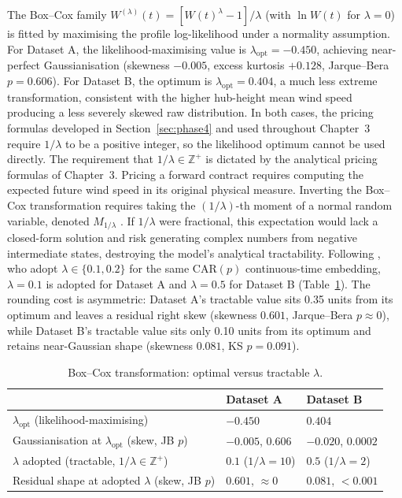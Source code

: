 \documentclass[11pt, a4paper, twoside]{article}
\begin{document}
The Box--Cox family $W^{(\lambda)}(t) = [W(t)^\lambda - 1]/\lambda$ (with $\ln W(t)$ for $\lambda = 0$) is fitted by maximising the profile log-likelihood under a normality assumption. For Dataset A, the likelihood-maximising value is $\lambda_{\text{opt}} = -0.450$, achieving near-perfect Gaussianisation (skewness $-0.005$, excess kurtosis $+0.128$, Jarque--Bera $p = 0.606$). For Dataset B, the optimum is $\lambda_{\text{opt}} = 0.404$, a much less extreme transformation, consistent with the higher hub-height mean wind speed producing a less severely skewed raw distribution. In both cases, the pricing formulas developed in Section~\ref{sec:phase4} and used throughout Chapter~3 require $1/\lambda$ to be a positive integer, so the likelihood optimum cannot be used directly. The requirement that $1/\lambda \in \mathbb{Z}^+$ is dictated by the analytical pricing formulas of Chapter~3. Pricing a forward contract requires computing the expected future wind speed in its original physical measure. Inverting the Box--Cox transformation requires taking the $(1/\lambda)$-th moment of a normal random variable, denoted $M_{1/\lambda}$ \citep{BenthSaltyteBenth2009}. If $1/\lambda$ were fractional, this expectation would lack a closed-form solution and risk generating complex numbers from negative intermediate states, destroying the model's analytical tractability. Following \citet{BenthSaltyteBenth2009}, who adopt $\lambda \in \{0.1, 0.2\}$ for the same CAR$(p)$ continuous-time embedding, $\lambda = 0.1$ is adopted for Dataset A and $\lambda = 0.5$ for Dataset B (Table~\ref{tab:boxcox}). The rounding cost is asymmetric: Dataset A's tractable value sits 0.35 units from its optimum and leaves a residual right skew (skewness $0.601$, Jarque--Bera $p \approx 0$), while Dataset B's tractable value sits only 0.10 units from its optimum and retains near-Gaussian shape (skewness $0.081$, KS $p = 0.091$).

\begin{table}[htbp]
\centering
\caption{Box--Cox transformation: optimal versus tractable $\lambda$.}
\label{tab:boxcox}
\begin{tabular}{l l l}
\toprule
& \textbf{Dataset A} & \textbf{Dataset B} \\
\midrule
$\lambda_{\text{opt}}$ (likelihood-maximising) & $-0.450$ & $0.404$ \\
Gaussianisation at $\lambda_{\text{opt}}$ (skew, JB $p$) & $-0.005$, $0.606$ & $-0.020$, $0.0002$ \\
$\lambda$ adopted (tractable, $1/\lambda \in \mathbb{Z}^+$) & $\mathbf{0.1}$ ($1/\lambda = 10$) & $\mathbf{0.5}$ ($1/\lambda = 2$) \\
Residual shape at adopted $\lambda$ (skew, JB $p$) & $0.601$, $\approx 0$ & $0.081$, $< 0.001$ \\
\bottomrule
\end{tabular}
\end{table}
\end{document}
